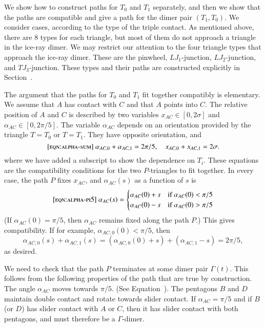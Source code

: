 We show how to construct paths for $T_0$ and $T_1$ separately, and
then we show that the paths are compatible and give a path for the
dimer pair $(T_1,T_0)$.  We consider cases, according to the type of
the triple contact.  As mentioned above, there are $8$ types for each
triangle, but most of them do not approach a triangle in the ice-ray
dimer.  We may restrict our attention to the four triangle types that
approach the ice-ray dimer.  These are the pinwheel, $LJ_1$-junction,
$LJ_2$-junction, and $TJ_3$-junction.  These types and their paths are
constructed explicitly in Section~.

The argument that the paths for $T_0$ and $T_1$ fit together
compatibly is elementary.  We assume that $A$ has contact with $C$ and
that $A$ points into $C$.  The relative position of $A$ and $C$ is
described by two variables $x_{AC}\in[0,2\sigma]$ and
$\alpha_{AC}\in[0,2\pi/5]$.  The variable $\alpha_{AC}$ depends on an
orientation provided by the triangle $T=T_0$ or $T=T_1$.  They have
opposite orientation, and
\begin{equation}\libel{eqn:alpha-sum}
\alpha_{AC,0}+\alpha_{AC,1} = 2\pi/5,\quad x_{AC,0} + x_{AC,1} = 2\sigma.
\end{equation}
where we have added a subscript to show the dependence on $T_i$.
These equations are the compatibility conditions for the two
$P$-triangles to fit together.  In every case, the path $P$ fixes
$x_{AC}$, and $\alpha_{AC}(s)$ as a function of $s$ is
\begin{equation}\libel{eqn:alpha-pi5}
\alpha_{AC}(s) = 
\begin{cases}
\alpha_{AC}(0) + s&\text{if } \alpha_{AC}(0) < \pi/5\\
\alpha_{AC}(0) - s&\text{if } \alpha_{AC}(0) > \pi/5\\
\end{cases}
\end{equation}
(If $\alpha_{AC}(0) = \pi/5$, then $\alpha_{AC}$ remains fixed along
the path $P$.)  This gives compatibility. If for example,
$\alpha_{AC,0}(0) < \pi/5$, then
\[
\alpha_{AC,0}(s) + \alpha_{AC,1}(s) 
= (\alpha_{AC,0}(0) + s) + (\alpha_{AC,1} - s) = 2\pi/5,
\]
as desired.

We need to check that the path $P$ terminates at some dimer pair
$\Gamma(t)$.  This follows from the following properties of the path
that are true by construction.  The angle $\alpha_{AC}$ moves towards
$\pi/5$. (See Equation~). The pentagons $B$ and $D$
maintain double contact and rotate towards slider contact.  If
$\alpha_{AC}=\pi/5$ and if $B$ (or $D$) has slider contact with $A$ or
$C$, then it has slider contact with both pentagons, and must
therefore be a $\Gamma$-dimer.

